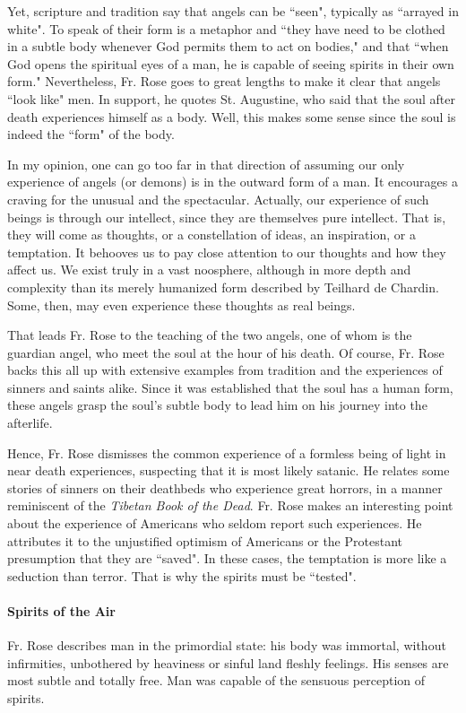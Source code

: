 Yet, scripture and tradition say that angels can be ``seen", typically as ``arrayed in white". To speak of their form is a metaphor and ``they have need to be clothed in a subtle body whenever God permits them to act on bodies," and that ``when God opens the spiritual eyes of a man, he is capable of seeing spirits in their own form." Nevertheless, Fr. Rose goes to great lengths to make it clear that angels ``look like" men. In support, he quotes St. Augustine, who said that the soul after death experiences himself as a body. Well, this makes some sense since the soul is indeed the ``form" of the body.

In my opinion, one can go too far in that direction of assuming our only experience of angels (or demons) is in the outward form of a man. It encourages a craving for the unusual and the spectacular. Actually, our experience of such beings is through our intellect, since they are themselves pure intellect. That is, they will come as thoughts, or a constellation of ideas, an inspiration, or a temptation. It behooves us to pay close attention to our thoughts and how they affect us. We exist truly in a vast noosphere, although in more depth and complexity than its merely humanized form described by Teilhard de Chardin. Some, then, may even experience these thoughts as real beings.

That leads Fr. Rose to the teaching of the two angels, one of whom is the guardian angel, who meet the soul at the hour of his death. Of course, Fr. Rose backs this all up with extensive examples from tradition and the experiences of sinners and saints alike. Since it was established that the soul has a human form, these angels grasp the soul's subtle body to lead him on his journey into the afterlife.

Hence, Fr. Rose dismisses the common experience of a formless being of light in near death experiences, suspecting that it is most likely satanic. He relates some stories of sinners on their deathbeds who experience great horrors, in a manner reminiscent of the \textit{Tibetan Book of the Dead}. Fr. Rose makes an interesting point about the experience of Americans who seldom report such experiences. He attributes it to the unjustified optimism of Americans or the Protestant presumption that they are ``saved". In these cases, the temptation is more like a seduction than terror. That is why the spirits must be ``tested".

\paragraph{Spirits of the Air}
Fr. Rose describes man in the primordial state: his body was immortal, without infirmities, unbothered by heaviness or sinful land fleshly feelings. His senses are most subtle and totally free. Man was capable of the sensuous perception of spirits.


